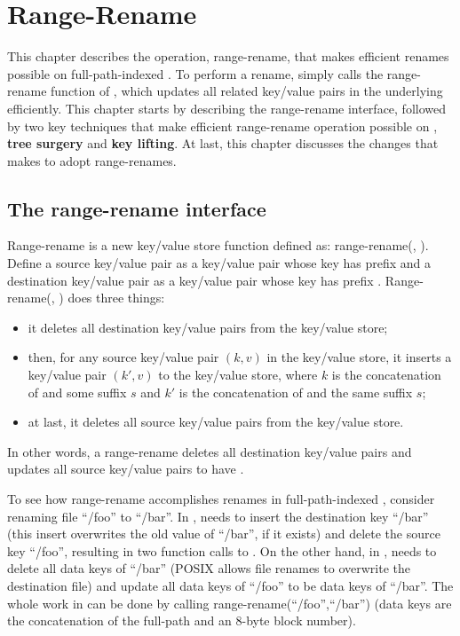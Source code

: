 \chapter{Range-Rename}
\label{chap:rename}

This chapter describes the \bet operation, range-rename, that makes efficient
renames possible on full-path-indexed \betrfs.
To perform a rename, \betrfs simply calls the range-rename function of \fti,
which updates all related key/value pairs in the underlying \bets efficiently.
This chapter starts by describing the range-rename interface,
followed by two key techniques that make efficient range-rename operation
possible on \bets, \textbf{tree surgery} and \textbf{key lifting}.
At last, this chapter discusses the changes that \betrfs makes to adopt
range-renames.

\section{The range-rename interface}

Range-rename is a new key/value store function defined as:
range-rename(\spre, \dpre).
Define a source key/value pair as a key/value pair whose key has prefix \spre
and a destination key/value pair as a key/value pair whose key has prefix \dpre.
Range-rename(\spre, \dpre) does three things:
\begin{itemize}
\item it deletes all destination key/value pairs from the key/value store;
\item then, for any source key/value pair $(k,v)$ in the key/value store,
it inserts a key/value pair $(k',v)$ to the key/value store,
where $k$ is the concatenation of \spre and some suffix $s$ and $k'$ is the
concatenation of \dpre and the same suffix $s$;
\item at last, it deletes all source key/value pairs from the key/value store.
\end{itemize}
In other words, a range-rename deletes all destination key/value pairs and
updates all source key/value pairs to have \dpre.

To see how range-rename accomplishes renames in full-path-indexed \betrfs,
consider renaming file ``/foo'' to ``/bar''.
In \mdb, \betrfs needs to insert the destination key ``/bar''
(this insert overwrites the old value of ``/bar'', if it exists)
and delete the source key ``/foo'', resulting in two function calls to \fti.
On the other hand, in \ddb, \betrfs needs to delete all data keys of ``/bar''
(POSIX allows file renames to overwrite the destination file) and update all
data keys of ``/foo'' to be data keys of ``/bar''.
The whole work in \ddb can be done by calling range-rename(``/foo'',``/bar'')
(data keys are the concatenation of the full-path and an 8-byte block number).

